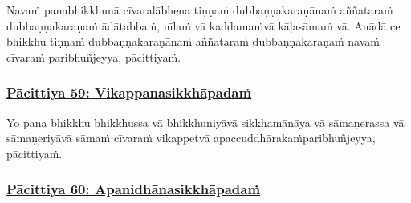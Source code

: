 Navaṁ pana\makeatletter\hyperlink{endnote339-appendix}\makeatother \thinspace bhikkhunā cīvaralābhena tiṇṇaṁ dubbaṇṇakaraṇānaṁ aññataraṁ dubbaṇṇakaraṇaṁ ādātabbaṁ, nīlaṁ vā kaddamaṁ\makeatletter\hyperlink{endnote339-appendix}\makeatother \thinspace vā kāḷasāmaṁ vā. Anādā ce bhikkhu tiṇṇaṁ dubbaṇṇakaraṇānaṁ aññataraṁ dubbaṇṇakaraṇaṁ navaṁ cīvaraṁ paribhuñjeyya, pācittiyaṁ.



\subsubsection*{\hyperref[exp59]{Pācittiya 59: Vikappanasikkhāpadaṁ}}
\label{pac59}
Yo pana bhikkhu bhikkhussa vā bhikkhuniyā\makeatletter\hyperlink{endnote340-appendix}\makeatother \thinspace vā sikkhamānāya vā sāmaṇerassa vā sāmaṇeriyā\makeatletter\hyperlink{endnote341-appendix}\makeatother \thinspace vā sāmaṁ cīvaraṁ vikappetvā apaccuddhārakaṁ\makeatletter\hyperlink{endnote342-appendix}\makeatother \thinspace paribhuñjeyya, pācittiyaṁ.



\subsubsection*{\hyperref[exp60]{Pācittiya 60: Apanidhānasikkhāpadaṁ}}
\label{pac60}

